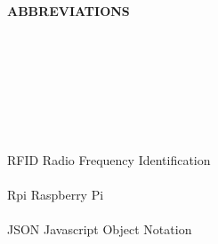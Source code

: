 \begin{center}
\textbf{\LARGE{ABBREVIATIONS}}\\[1cm]

\end{center}
\normalsize

\


\



\


\


\begin{abbrv}
\hspace{-0.75cm} 
RFID      \hspace{4.13cm} Radio Frequency Identification\\\\
Rpi     \hspace{4.6cm}Raspberry Pi\\\\
JSON      \hspace{4.13cm} Javascript Object Notation\\

\end{abbrv}
